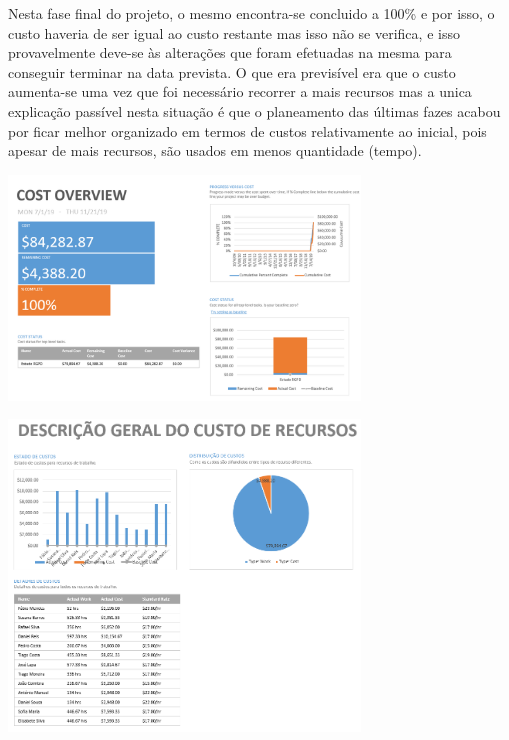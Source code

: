 Nesta fase final do projeto, o mesmo encontra-se concluido a 100\% e por isso, o custo haveria de ser igual ao custo restante mas isso não se verifica, e isso provavelmente deve-se às alterações que foram efetuadas na mesma para conseguir terminar na data prevista. O que era previsível era que o custo aumenta-se uma vez que foi necessário recorrer a mais recursos mas a unica explicação passível nesta situação é que o planeamento das últimas fazes acabou por ficar melhor organizado em termos de custos relativamente ao inicial, pois apesar de mais recursos, são usados em menos quantidade (tempo).

\begin{center}
    \includegraphics[width=0.7\textwidth]{media/baseline3CostOverview.PNG}
\end{center}

\begin{center}
    \includegraphics[width=0.7\textwidth]{media/baseline3ResourcesCost.PNG}
\end{center}

